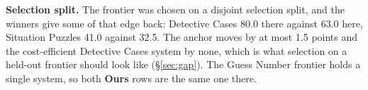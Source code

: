 \begin{table}[t]
\vspace{1pt}
\footnotesize
\textbf{Selection split.} The frontier was chosen on a disjoint selection split, and the winners
give some of that edge back: Detective Cases 80.0 there against 63.0 here, Situation Puzzles 41.0
against 32.5. The anchor moves by at most 1.5 points and the cost-efficient Detective Cases system
by none, which is what selection on a held-out frontier should look like (\S\ref{sec:gap}).
The Guess Number frontier holds a single system, so both \textbf{Ours} rows are the same one there.
\end{table}
